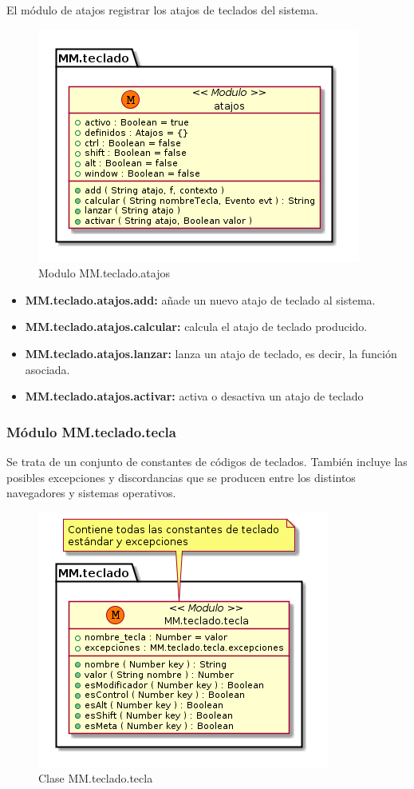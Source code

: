 El módulo de atajos registrar los atajos de teclados del sistema.


\begin{figure}[tbph]
\centering
\includegraphics[width=0.6\linewidth]{imagenes/diagrama-clase-mm-teclado-atajos}
\caption{Modulo MM.teclado.atajos}
\label{fig:diagrama-clase-mm-teclado-atajos}
\end{figure}

\begin{itemize}
\item \textbf{MM.teclado.atajos.add:} añade un nuevo atajo de teclado al sistema.
\item \textbf{MM.teclado.atajos.calcular:} calcula el atajo de teclado producido.
\item \textbf{MM.teclado.atajos.lanzar:} lanza un atajo de teclado, es decir, la función asociada. 
\item \textbf{MM.teclado.atajos.activar:} activa o desactiva un atajo de teclado 
\end{itemize}

\subsubsection{Módulo MM.teclado.tecla}
Se trata de un conjunto de constantes de códigos de teclados. También incluye las posibles
excepciones y discordancias que se producen entre los distintos navegadores y sistemas operativos.

\begin{figure}[tbph]
\centering
\includegraphics[width=0.4\linewidth]{imagenes/diagrama-clase-mm-teclado-tecla}
\caption{Clase MM.teclado.tecla}
\label{fig:diagrama-clase-mm-teclado-tecla}
\end{figure}

